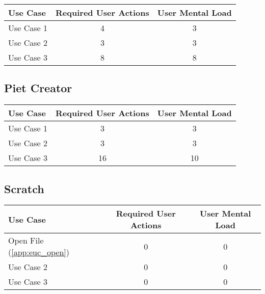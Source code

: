 \begin{tabularx}{\textwidth}{Xcc}
\textbf{Use Case} & \textbf{Required User Actions} & \textbf{User Mental Load}\\
\hline
Use Case 1                          & 4 & 3 \\
Use Case 2                          & 3 & 3 \\
Use Case 3                          & 8 & 8
\end{tabularx}

\subsection*{Piet Creator}




\begin{tabularx}{\textwidth}{Xcc}
\textbf{Use Case} & \textbf{Required User Actions} & \textbf{User Mental Load}\\
\hline
Use Case 1                          & 3 & 3 \\
Use Case 2                          & 3 & 3 \\
Use Case 3                          & 16 & 10
\end{tabularx}

\subsection*{Scratch}

\begin{tabularx}{\textwidth}{Xcc}
\textbf{Use Case} & \textbf{Required User Actions} & \textbf{User Mental Load}\\
\hline
Open File (\ref{app:euc_open}) & 0 & 0 \\
Use Case 2                     & 0 & 0 \\
Use Case 3                     & 0 & 0
\end{tabularx}

